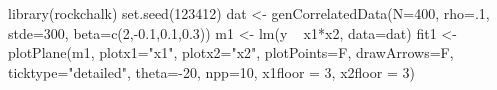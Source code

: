 \begin{Schunk}
\begin{Sinput}
 library(rockchalk)
 set.seed(123412)
 dat <- genCorrelatedData(N=400, rho=.1, stde=300, beta=c(2,-0.1,0.1,0.3))
 m1 <- lm(y ~ x1*x2, data=dat)
 fit1 <- plotPlane(m1, plotx1="x1", plotx2="x2", plotPoints=F, drawArrows=F, ticktype="detailed", theta=-20, npp=10, x1floor = 3, x2floor = 3)
\end{Sinput}
\end{Schunk}
